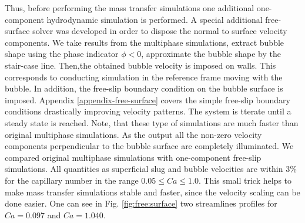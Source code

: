 \documentclass{article}
\begin{document}
\begin{description}
Thus, before performing the mass transfer simulations one additional one-component hydrodynamic
simulation is performed. A special additional free-surface solver was developed in order to dispose
the normal to surface velocity components. We take results from the multiphase simulations, extract
bubble shape using the phase indicator $\phi<0$, approximate the bubble shape by the stair-case
line. Then,the obtained bubble velocity is imposed on walls. This corresponds to conducting
simulation in the reference frame moving with the bubble. In addition, the free-slip boundary
condition on the bubble surface is imposed. Appendix \ref{appendix-free-surface} covers the simple
free-slip boundary conditions drastically improving velocity patterns. The system is tterate until a
steady state is reached. Note, that these type of simulations are much faster than original
multiphase simulations. As the output all the non-zero velocity components perpendicular to the
bubble surface are completely illuminated. We compared original multiphase simulations with
one-component free-slip simulations. All quantities as superficial slug and bubble velocities are
within $3\%$ for the capillary number in the range $0.05\leq Ca \leq 1.0$. This small trick helps to
make mass transfer simulations stable and faster, since the velocity scaling can be done easier. One
can see in Fig. \ref{fig:free:surface} two streamlines profiles for $Ca=0.097$  and $Ca=1.040$.
\begin{figure}[htb!]

\end{figure}
\end{description}
\end{document}
